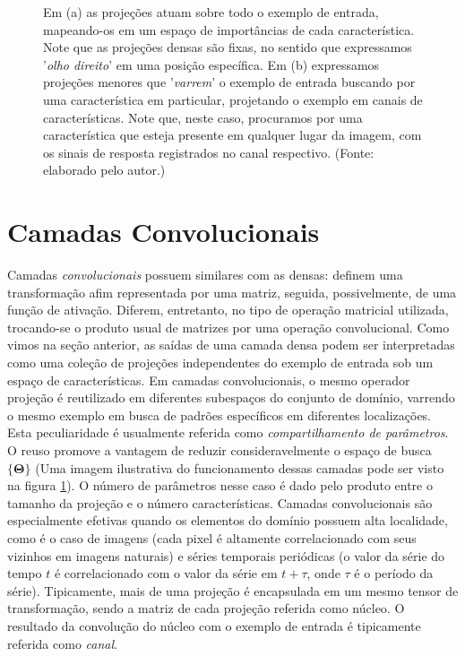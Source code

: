 \begin{figure}[ht!]
\begin{center}
\begin{subfigure}{0.6\textwidth}
		\caption{}
	\end{subfigure}
	\end{center}
	\small Em (a) as projeções atuam sobre todo o exemplo de entrada, mapeando-os em um espaço de importâncias de cada característica. Note que as projeções densas são fixas, no sentido que expressamos '\textit{olho direito}' em uma posição específica. Em (b) expressamos projeções menores que '\textit{varrem}' o exemplo de entrada buscando por uma característica em particular, projetando o exemplo em canais de características. Note que, neste caso, procuramos por uma característica que esteja presente em qualquer lugar da imagem, com os sinais de resposta registrados no canal respectivo. (Fonte: elaborado pelo autor.)
	\label{conv_lin}
\end{figure}

\section{Camadas Convolucionais}

Camadas \textit{convolucionais} \cite{LeCun1989, LeCun98} possuem similares com as densas: definem uma transformação afim representada por uma matriz, seguida, possivelmente, de uma função de ativação. Diferem, entretanto, no tipo de operação matricial utilizada, trocando-se o produto usual de matrizes por uma operação convolucional. Como vimos na seção anterior, as saídas de uma camada densa podem ser interpretadas como uma coleção de projeções independentes do exemplo de entrada sob um espaço de características. Em camadas convolucionais, o mesmo operador projeção é reutilizado em diferentes subespaços do conjunto de domínio, varrendo o mesmo exemplo em busca de padrões específicos em diferentes localizações. Esta peculiaridade é usualmente referida como \textit{compartilhamento de parâmetros}. O reuso promove a vantagem de reduzir consideravelmente o espaço de busca $\{\mathbf{\Theta}\}$ (Uma imagem ilustrativa do funcionamento dessas camadas pode ser visto na figura \ref{conv_lin}). O número de parâmetros nesse caso é dado pelo produto entre o tamanho da projeção e o número características. Camadas convolucionais são especialmente efetivas quando os elementos do domínio possuem alta localidade, como é o caso de imagens (cada pixel é altamente correlacionado com seus vizinhos em imagens naturais) e séries temporais periódicas (o valor da série do tempo $t$ é correlacionado com o valor da série em $t + \tau$, onde $\tau$ é o período da série). Tipicamente, mais de uma projeção é encapsulada em um mesmo tensor de transformação, sendo a matriz de cada projeção referida como núcleo. O resultado da convolução do núcleo com o exemplo de entrada é tipicamente referida como \textit{canal}.

